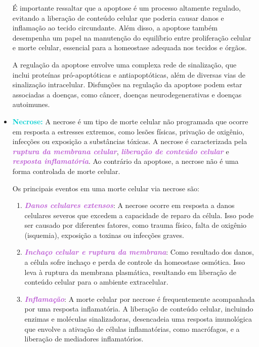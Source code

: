\documentclass[11pt,a4paper]{article}
\begin{document}
\begin{itemize}
			É importante ressaltar que a apoptose é um processo altamente regulado, evitando a liberação de conteúdo celular que poderia causar danos e inflamação ao tecido circundante. Além disso, a apoptose também desempenha um papel na manutenção do equilíbrio entre proliferação celular e morte celular, essencial para a homeostase adequada nos tecidos e órgãos.

			A regulação da apoptose envolve uma complexa rede de sinalização, que inclui proteínas pró-apoptóticas e antiapoptóticas, além de diversas vias de sinalização intracelular. Disfunções na regulação da apoptose podem estar associadas a doenças, como câncer, doenças neurodegenerativas e doenças autoimunes.

		\item \textcolor{DarkTurquoise}{\textbf{Necrose:}} A necrose é um tipo de morte celular não programada que ocorre em resposta a estresses extremos, como lesões físicas, privação de oxigênio, infecções ou exposição a substâncias tóxicas. A necrose é caracterizada pela \textcolor{MediumOrchid}{\textbf{\textit{ruptura da membrana celular}}}, \textcolor{MediumOrchid}{\textbf{\textit{liberação de conteúdo celular}}} e \textcolor{MediumOrchid}{\textbf{\textit{resposta inflamatória}}}. Ao contrário da apoptose, a necrose não é uma forma controlada de morte celular.
		
			Os principais eventos em uma morte celular via necrose são:

			\begin{enumerate}
				\item \textcolor{MediumOrchid}{\textbf{\textit{Danos celulares extensos}}}: A necrose ocorre em resposta a danos celulares severos que excedem a capacidade de reparo da célula. Isso pode ser causado por diferentes fatores, como trauma físico, falta de oxigênio (isquemia), exposição a toxinas ou infecções graves.

				\item \textcolor{MediumOrchid}{\textbf{\textit{Inchaço celular e ruptura da membrana}}}: Como resultado dos danos, a célula sofre inchaço e perda de controle da homeostase osmótica. Isso leva à ruptura da membrana plasmática, resultando em liberação de conteúdo celular para o ambiente extracelular.
				
				\item \textcolor{MediumOrchid}{\textbf{\textit{Inflamação}}}: A morte celular por necrose é frequentemente acompanhada por uma resposta inflamatória. A liberação de conteúdo celular, incluindo enzimas e moléculas sinalizadoras, desencadeia uma resposta imunológica que envolve a ativação de células inflamatórias, como macrófagos, e a liberação de mediadores inflamatórios.
				

\end{enumerate}
\end{itemize}
\end{document}
